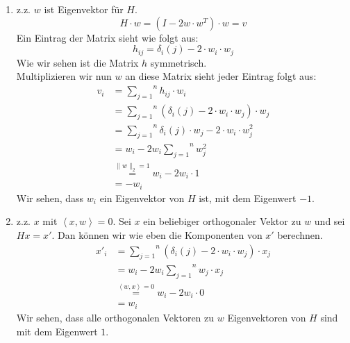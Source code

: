 \documentclass[11pt,a4paper,ngerman]{article}
\begin{document}
\begin{enumerate}[1.]
    \item z.z. $w$ ist Eigenvektor für $H$.\\
        \begin{equation*}
            H \cdot w = (I - 2 w \cdot w^T) \cdot w = v
        \end{equation*}
        Ein Eintrag der Matrix sieht wie folgt aus:
        \begin{equation}
            h_{ij} = \delta_{i}(j) - 2\cdot w_i \cdot w_j
        \end{equation}
        Wie wir sehen ist die Matrix $h$ symmetrisch.\\
        Multiplizieren wir nun $w$ an diese Matrix sieht jeder Eintrag
        folgt aus:
        \begin{equation*}\begin{split}
            v_i &= \overset{n}{\underset{j=1}{\sum}} h_{ij} \cdot w_i\\
                &= \overset{n}{\underset{j=1}{\sum}} (\delta_{i}(j) - 2\cdot w_i \cdot w_j) \cdot w_j\\
                &= \overset{n}{\underset{j=1}{\sum}} \delta_{i}(j) \cdot w_j - 2 \cdot w_i \cdot w_j^2\\
                &= w_i - 2 w_i \overset{n}{\underset{j=1}{\sum}} w_j^2\\
                &\stackrel{\|w\|_2 = 1}{=} w_i - 2 w_i \cdot 1\\
                &= - w_i
        \end{split}\end{equation*}
        Wir sehen, dass $w_i$ ein Eigenvektor von $H$ ist, mit dem Eigenwert $-1$.
    \item z.z. $x$ mit $\left\langle x , w \right\rangle = 0$.
        Sei $x$ ein beliebiger orthogonaler Vektor zu $w$ und sei $H x =x'$.
        Dan können wir wie eben die Komponenten von $x'$ berechnen.
        \begin{equation*}\begin{split}
            x'_i &= \overset{n}{\underset{j=1}{\sum}} (\delta_{i}(j) - 2 \cdot w_i \cdot w_j) \cdot x_j\\
                 &= w_i - 2 w_i \overset{n}{\underset{j=1}{\sum}} w_j \cdot x_j\\
                 &\stackrel{\left\langle w, x \right\rangle = 0}{=} w_i - 2 w_i \cdot 0\\
                 &= w_i
        \end{split}\end{equation*}
        Wir sehen, dass alle orthogonalen Vektoren zu $w$ Eigenvektoren von $H$ sind mit dem Eigenwert $1$.
\end{enumerate}
\end{document}
